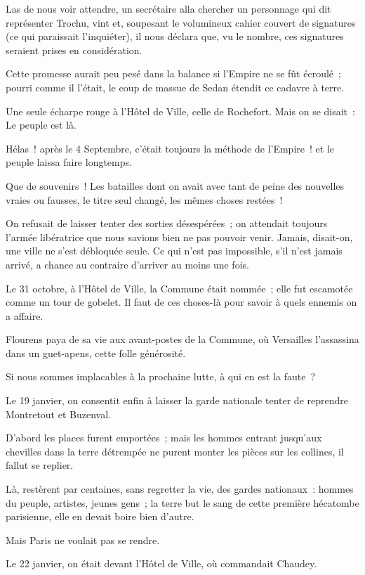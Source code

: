 \documentclass[french,twoside]{book} %
\begin{document}
Las de nous voir attendre, un secrétaire alla chercher un personnage qui dit représenter Trochu, vint et, soupesant le volumineux cahier  couvert de signatures (ce qui paraissait l’inquiéter), il nous déclara que, vu le nombre, ces signatures seraient prises en considération.\par
Cette promesse aurait peu pesé dans la balance si l’Empire ne se fût écroulé ; pourri comme il l’était, le coup de massue de Sedan étendit ce cadavre à terre.\par
Une seule écharpe rouge à l’Hôtel de Ville, celle de Rochefort. Mais on se disait : Le peuple est là.\par
Hélas ! après le 4 Septembre, c’était toujours la méthode de l’Empire ! et le peuple laissa faire longtemps.\par
Que de souvenirs ! Les batailles dont on avait avec tant de peine des nouvelles vraies ou fausses, le titre seul changé, les mêmes choses restées !\par
On refusait de laisser tenter des sorties désespérées ; on attendait toujours l’armée libératrice que nous savions bien ne pas pouvoir venir. Jamais, disait-on, une ville ne s’est débloquée seule. Ce qui n’est pas impossible, s’il n’est jamais arrivé, a chance au contraire d’arriver au moins une fois.\par
Le 31 octobre, à l’Hôtel de Ville, la Commune était nommée ; elle fut escamotée comme un tour de gobelet. Il faut de ces choses-là pour savoir à quels ennemis on a affaire.\par
 Flourens paya de sa vie aux avant-postes de la Commune, où Versailles l’assassina dans un guet-apens, cette folle générosité.\par
Si nous sommes implacables à la prochaine lutte, à qui en est la faute ?\par
Le 19 janvier, on consentit enfin à laisser la garde nationale tenter de reprendre Montretout et Buzenval.\par
D’abord les places furent emportées ; mais les hommes entrant jusqu’aux chevilles dans la terre détrempée ne purent monter les pièces sur les collines, il fallut se replier.\par
Là, restèrent par centaines, sans regretter la vie, des gardes nationaux : hommes du peuple, artistes, jeunes gens ; la terre but le sang de cette première hécatombe parisienne, elle en devait boire bien d’autre.\par
Mais Paris ne voulait pas se rendre.\par
Le 22 janvier, on était devant l’Hôtel de Ville, où commandait Chaudey.\par
\end{document}
